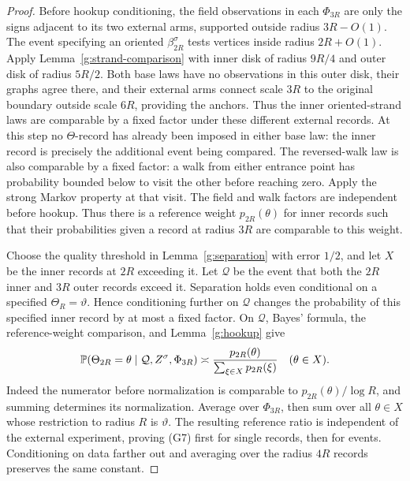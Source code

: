 \begin{proof}
Before hookup conditioning, the field observations in each
\(\Phi_{3R}\) are only the signs adjacent to its two external
arms, supported outside radius \(3R-O(1)\). The event specifying
an oriented \(\beta_{2R}^\sigma\) tests vertices inside
radius \(2R+O(1)\). Apply Lemma~\ref{g:strand-comparison} with
inner disk of radius \(9R/4\) and outer disk of radius \(5R/2\).
Both base laws have no observations in this outer disk, their graphs
agree there, and their external arms connect scale \(3R\) to the
original boundary outside scale \(6R\), providing the anchors.
Thus the inner oriented-strand laws are comparable by a fixed factor
under these different external records. At this step no
\(\Theta\)-record has already been imposed in either base law:
the inner record is precisely the additional event being compared.
The reversed-walk law is also comparable by a
fixed factor: a walk from either entrance point has probability
bounded below to visit the other before reaching zero. Apply the
strong Markov property at that visit. The field and walk factors
are independent before hookup. Thus there is a reference weight
\(p_{2R}(\theta)\) for inner records such that their probabilities
given a record at radius \(3R\) are comparable to this weight.

Choose the quality threshold in Lemma~\ref{g:separation} with error
\(1/2\), and let \(X\) be the inner records at \(2R\) exceeding it.
Let \(\mathcal Q\) be the event that both the \(2R\) inner and
\(3R\) outer records exceed it. Separation holds even conditional
on a specified \(\Theta_R=\vartheta\). Hence conditioning further
on \(\mathcal Q\) changes the probability of this specified inner
record by at most a fixed factor. On \(\mathcal Q\), Bayes' formula,
the reference-weight comparison, and Lemma~\ref{g:hookup} give
\[
 \mathbb P(\Theta_{2R}=\theta\mid\mathcal Q,Z^\sigma,\Phi_{3R})
 \asymp \frac{p_{2R}(\theta)}{\sum_{\xi\in X}p_{2R}(\xi)}
 \quad(\theta\in X).
\]
Indeed the numerator before normalization is comparable to
\(p_{2R}(\theta)/\log R\), and summing determines its normalization.
Average over \(\Phi_{3R}\), then sum over all \(\theta\in X\)
whose restriction to radius \(R\) is \(\vartheta\).
The resulting reference ratio is independent of the external
experiment, proving (G7) first for single records, then for events.
Conditioning on data farther out and averaging over the radius
\(4R\) records preserves the same constant.
\end{proof}

